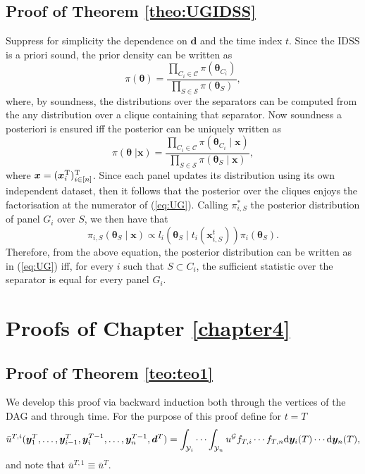 \subsection{Proof of Theorem \ref{theo:UGIDSS}}
Suppress for simplicity the dependence on $\bm{d}$ and the time index $t$. Since the IDSS is a priori sound, the prior density can be written as 
\[
\pi(\bm{\theta})=\frac{\prod_{C_i\in\mathcal{C}}\pi(\bm{\theta}_{C_i})}{\prod_{S\in\mathcal{S}}\pi(\bm{\theta}_{S})},
\]
where, by soundness, the distributions over the separators can be computed from the any distribution over a clique containing that separator. Now soundness a posteriori is ensured iff the posterior can be uniquely written as
\begin{equation}
\label{eq:UG}
\pi(\bm{\theta}\;|\bm{x})=\frac{\prod_{C_i\in\mathcal{C}}\pi(\bm{\theta}_{C_i}\;|\;\bm{x})}{\prod_{S\in\mathcal{S}}\pi(\bm{\theta}_{S}\;|\;\bm{x})},
\end{equation}
where $\bm{x}=(\bm{x}_i^{\textnormal{T}})^{\textnormal{T}}_{i\in[n]}$.
Since each panel updates its distribution using its own independent dataset, then it follows that the posterior over the cliques enjoys the factorisation at the numerator of (\ref{eq:UG}). Calling $\pi^*_{i,S}$ the posterior distribution of panel $G_i$ over $S$, we then have that
\[
\pi_{i,S}(\bm{\theta}_S\;|\;\bm{x})\propto l_i(\bm{\theta}_S\;|\; t_{i}(\bm{x}^t_{i,S}))\pi_i(\bm{\theta}_S).
\]  
Therefore, from the above equation, the posterior distribution can be written as in (\ref{eq:UG}) iff, for every $i$ such that $S\subset C_i$, the sufficient statistic over the separator is equal for every panel $G_i$.

\label{proof:UGIDSS}

\section{Proofs of Chapter \ref{chapter4}}


\subsection{Proof of Theorem \ref{teo:teo1}}
\label{proofone}
We develop this proof via backward induction both through the vertices of the DAG and through time. For the purpose of this proof define for $t=T$
\begin{equation}
\bar{u}^{T,i}(\bm{y}^T_1,\dots, \bm{y}^T_{i-1},\bm{y}^{T-1}_{i},\dots,\bm{y}^{T-1}_{n},\bm{d}^T)=\int_{\mathcal{Y}_i}\cdots \int_{\mathcal{Y}_n}u^{\Gr}f_{T,i}\cdots f_{T,n}\dr\bm{y}_i(T)\cdots\dr\bm{y}_n(T),
\label{proof1}
\end{equation}
and note that $\bar{u}^{T,1}\equiv \bar{u}^T$.

